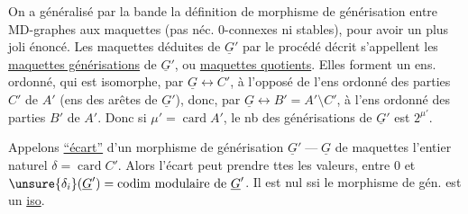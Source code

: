 \uline{} On a généralisé par la bande la définition de morphisme de générisation entre MD-graphes aux maquettes (pas néc. $0$-connexes ni stables), pour avoir un plus joli énoncé. Les maquettes déduites de $\underline{G}'$ par le procédé décrit s'appellent les \uline{maquettes générisations} de $\underline{G}'$, ou \uline{maquettes quotients}. Elles forment un ens. ordonné, qui est isomorphe, par $\underline{G}\longleftrightarrow C'$, à l'opposé de l'ens ordonné des parties $C'$ de $A'$ (ens des arêtes de $\underline{G}'$), donc, par $\underline{G}\longleftrightarrow B'=A'\setminus C'$, à l'ens ordonné des parties $B'$ de $A'$. Donc si $\mu'=\operatorname{card}A'$, le nb des générisations de $\underline{G}'$ est $2^{\mu'}$.

Appelons \uline{``écart''} d'un morphisme de générisation $\underline{G}'\mathbin{\text{---}}\underline{G}$ de maquettes l'entier naturel $\delta=\operatorname{card}C'$. Alors l'écart     peut prendre ttes les valeurs, entre $0$ et $\unsure{\delta_i}(\underline{G}')=\text{codim modulaire de }\underline{G}'$. Il est nul ssi le morphisme de gén. est un \uline{iso}.
